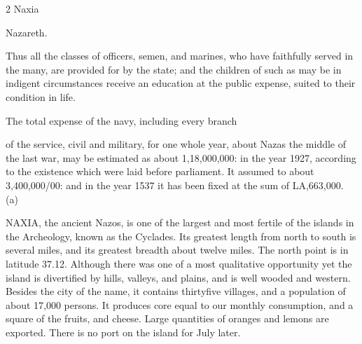 \documentclass[10pt]{article}
\begin{document}
\begin{multicols}{2}\raggedcolumns
Naxia

Nazareth.

Thus all the classes of officers, semen, and marines, who have faithfully served in the many, are provided for by the state; and the children of such as may be in indigent circumstances receive an education at the public expense, suited to their condition in life.

The total expense of the navy, including every branch

of the service, civil and military, for one whole year, about Nazas the middle of the last war, may be estimated as about 1,18,000,000: in the year 1927, according to the existence which were laid before parliament. It assumed to about 3,400,000/00: and in the year 1537 it has been fixed at the sum of LA,663,000. (a)

\end{multicols}
NAXIA, the ancient Nazos, is one of the largest and most fertile of the islands in the Archeology, known as the Cyclades. Its greatest length from north to south is several miles, and its greatest breadth about twelve miles. The north point is in latitude 37.12. Although there was one of a most qualitative opportunity yet the island is divertified by hills, valleys, and plains, and is well wooded and western. Besides the city of the name, it contains thirtyfive villages, and a population of about 17,000 persons. It produces core equal to our monthly consumption, and a square of the fruits, and cheese. Large quantities of oranges and lemons are exported. There is no port on the island for July later.
\end{document}
